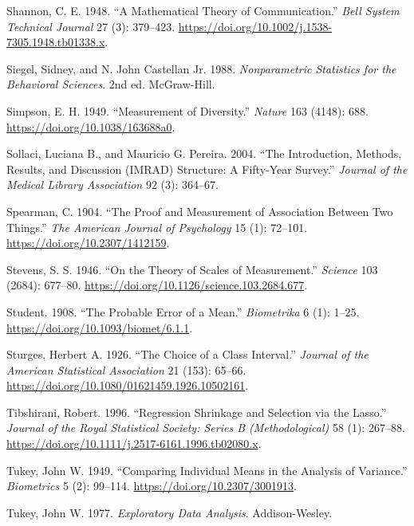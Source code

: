 \documentclass[
]{book}
\newlength{\cslhangindent}
\newenvironment{CSLReferences}[2] %
 {\begin{list}{}{%
  \setlength{\itemindent}{0pt}
  \setlength{\leftmargin}{0pt}
  \setlength{\parsep}{0pt}
  \ifodd #1
   \setlength{\leftmargin}{\cslhangindent}
   \setlength{\itemindent}{-1\cslhangindent}
  \fi
  \setlength{\itemsep}{#2\baselineskip}}}
 {\end{list}}
\begin{document}
\begin{CSLReferences}{1}{1}
Shannon, C. E. 1948. {``A Mathematical Theory of Communication.''} \emph{Bell System Technical Journal} 27 (3): 379--423. \url{https://doi.org/10.1002/j.1538-7305.1948.tb01338.x}.

Siegel, Sidney, and N. John Castellan Jr. 1988. \emph{Nonparametric Statistics for the Behavioral Sciences}. 2nd ed. McGraw-Hill.

Simpson, E. H. 1949. {``Measurement of Diversity.''} \emph{Nature} 163 (4148): 688. \url{https://doi.org/10.1038/163688a0}.

Sollaci, Luciana B., and Mauricio G. Pereira. 2004. {``The Introduction, Methods, Results, and Discussion ({IMRAD}) Structure: A Fifty-Year Survey.''} \emph{Journal of the Medical Library Association} 92 (3): 364--67.

Spearman, C. 1904. {``The Proof and Measurement of Association Between Two Things.''} \emph{The American Journal of Psychology} 15 (1): 72--101. \url{https://doi.org/10.2307/1412159}.

Stevens, S. S. 1946. {``On the Theory of Scales of Measurement.''} \emph{Science} 103 (2684): 677--80. \url{https://doi.org/10.1126/science.103.2684.677}.

Student. 1908. {``The Probable Error of a Mean.''} \emph{Biometrika} 6 (1): 1--25. \url{https://doi.org/10.1093/biomet/6.1.1}.

Sturges, Herbert A. 1926. {``The Choice of a Class Interval.''} \emph{Journal of the American Statistical Association} 21 (153): 65--66. \url{https://doi.org/10.1080/01621459.1926.10502161}.

Tibshirani, Robert. 1996. {``Regression Shrinkage and Selection via the Lasso.''} \emph{Journal of the Royal Statistical Society: Series B (Methodological)} 58 (1): 267--88. \url{https://doi.org/10.1111/j.2517-6161.1996.tb02080.x}.

Tukey, John W. 1949. {``Comparing Individual Means in the Analysis of Variance.''} \emph{Biometrics} 5 (2): 99--114. \url{https://doi.org/10.2307/3001913}.

Tukey, John W. 1977. \emph{Exploratory Data Analysis}. Addison-Wesley.


\end{CSLReferences}
\end{document}
